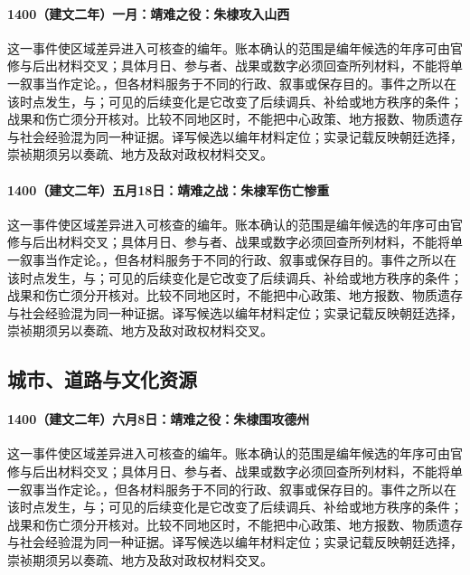 \paragraph{1400（建文二年）一月：靖难之役：朱棣攻入山西} 这一事件使区域差异进入可核查的编年。账本确认的范围是编年候选的年序可由官修与后出材料交叉；具体月日、参与者、战果或数字必须回查所列材料，不能将单一叙事当作定论。，但各材料服务于不同的行政、叙事或保存目的。事件之所以在该时点发生，与；可见的后续变化是它改变了后续调兵、补给或地方秩序的条件；战果和伤亡须分开核对。比较不同地区时，不能把中心政策、地方报数、物质遗存与社会经验混为同一种证据。译写候选以编年材料定位；实录记载反映朝廷选择，崇祯期须另以奏疏、地方及敌对政权材料交叉。

\paragraph{1400（建文二年）五月18日：靖难之战：朱棣军伤亡惨重} 这一事件使区域差异进入可核查的编年。账本确认的范围是编年候选的年序可由官修与后出材料交叉；具体月日、参与者、战果或数字必须回查所列材料，不能将单一叙事当作定论。，但各材料服务于不同的行政、叙事或保存目的。事件之所以在该时点发生，与；可见的后续变化是它改变了后续调兵、补给或地方秩序的条件；战果和伤亡须分开核对。比较不同地区时，不能把中心政策、地方报数、物质遗存与社会经验混为同一种证据。译写候选以编年材料定位；实录记载反映朝廷选择，崇祯期须另以奏疏、地方及敌对政权材料交叉。

\subsection{城市、道路与文化资源}

\paragraph{1400（建文二年）六月8日：靖难之役：朱棣围攻德州} 这一事件使区域差异进入可核查的编年。账本确认的范围是编年候选的年序可由官修与后出材料交叉；具体月日、参与者、战果或数字必须回查所列材料，不能将单一叙事当作定论。，但各材料服务于不同的行政、叙事或保存目的。事件之所以在该时点发生，与；可见的后续变化是它改变了后续调兵、补给或地方秩序的条件；战果和伤亡须分开核对。比较不同地区时，不能把中心政策、地方报数、物质遗存与社会经验混为同一种证据。译写候选以编年材料定位；实录记载反映朝廷选择，崇祯期须另以奏疏、地方及敌对政权材料交叉。

